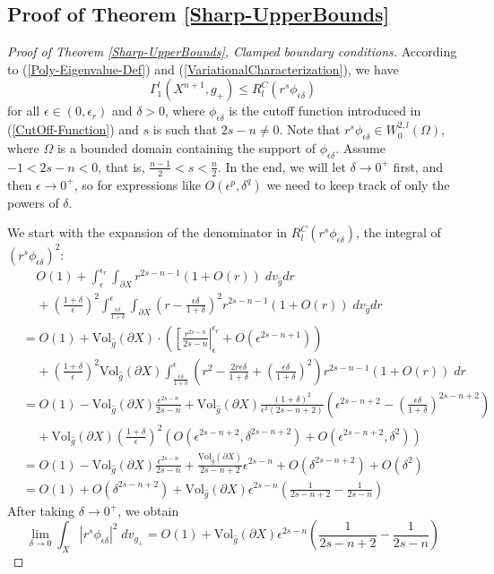 \documentclass{amsart}
\newcommand{\Vol}{\text{Vol}}
\newcommand{\D}{\delta}
\newcommand{\E}{\epsilon}
\begin{document}
\subsection{Proof of Theorem \ref{Sharp-UpperBounds}}

\begin{proof}[Proof of Theorem \ref{Sharp-UpperBounds}, Clamped boundary conditions]
According to (\ref{Poly-Eigenvalue-Def}) and (\ref{VariationalCharacterization}), we have
    \[
    \Gamma^l_1(X^{n+1}, g_+)\le R^C_l(r^{s}\phi_{\E\D})
    \]
    for all $\epsilon\in(0,\epsilon_r)$ and $\D>0$, where $\phi_{\E\D}$ is the cutoff function introduced in (\ref{CutOff-Function}) and $s$ is such that $2s-n\not = 0$. Note that $r^{s}\phi_{\E\D}\in W^{2,l}_0(\Omega)$, where $\Omega$ is a bounded domain containing the support of $\phi_{\E\D}$. Assume $-1<2s - n< 0$, that is, $\frac{n-1}{2}<s<\frac{n}{2}$. In the end, we will let $\D\to 0^+$ first, and then $\E\to0^+$, so for expressions like $O(\E^p,\D^q)$ we need to keep track of only the powers of $\D$. 
    
    We start with the expansion of the denominator in $R^C_l(r^s\phi_{\E\D})$, the integral of $(r^s\phi_{\E\D})^2$:
    \[
    \begin{split}
         &\;\;\;\;O(1) + \int_\E^{\E_r}\int_{\partial X} r^{2s-n-1}(1+O(r))\;dv_{\hat g}dr \\&\;\;\;\;+ \left(\frac{1+\D}{\E}\right)^2\int_{\frac{\E\D}{1+\D}}^\E\int_{\partial X}\left(r-\frac{\E\D}{1+\D}\right)^2r^{2s-n-1}(1+O(r))\;dv_{\hat g}dr \\&= O(1) + \Vol_{\hat g}(\partial X)\cdot \left(\left[\frac{r^{2s-n}}{2s-n}\right|^{\E_r}_{\E} + O(\E^{2s-n+1})\right) \\&\;\;\;\; + \left(\frac{1+\D}{\E}\right)^2\Vol_{\hat g}(\partial X)\int_{\frac{\E\D}{1+\D}}^\E\left(r^2-\frac{2r\E\D}{1+\D}+\left(\frac{\E\D}{1+\D}\right)^2\right)r^{2s-n-1}(1+O(r))\;dr \\&= O(1) - \Vol_{\hat g}(\partial X)\frac{\E^{2s-n}}{2s-n} + \Vol_{\hat g}(\partial X)\frac{(1+\D)^2}{\E^2(2s-n+2)} \left(\E^{2s-n+2} - \left(\frac{\E\D}{1+\D}\right)^{2s-n+2}\right)\\&\;\;\;\;+ \Vol_{\hat g}(\partial X)\left(\frac{1+\D}{\E}\right)^2\left(O(\E^{2s-n+2},\D^{2s-n+2}) + O(\E^{2s-n+2},\D^2) \right) \\&= O(1) - \Vol_{\hat g}(\partial X)\frac{\E^{2s-n}}{2s-n} + \frac{\Vol_{\hat g}(\partial X)}{2s-n+2}\E^{2s-n}+ O(\D^{2s-n+2}) + O(\D^2) \\ &= O(1) + O(\D^{2s-n+2}) + \Vol_{\hat g}(\partial X)\E^{2s-n}\left(\frac{1}{2s -n + 2} - \frac{1}{2s-n}\right)
    \end{split}
    \]
    After taking $\D\to 0^+$, we obtain
    \begin{equation}\label{Sharp-UB-Clamped1}
    \lim_{\D \to 0}\int_X |r^s\phi_{\E\D}|^2\;dv_{g_+} = O(1) + \Vol_{\hat g}(\partial X)\E^{2s-n}\left(\frac{1}{2s -n + 2} - \frac{1}{2s-n}\right)
    \end{equation}
    

\end{proof}
\end{document}

